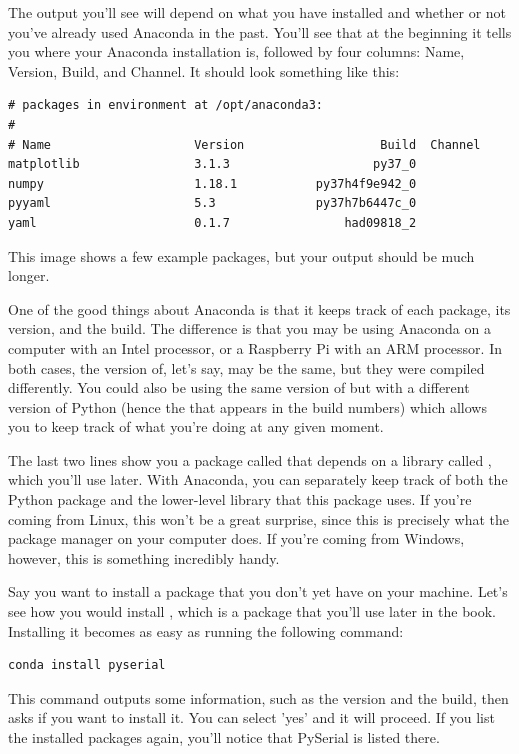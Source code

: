 The output you'll see will depend on what you have installed and whether or not you've already used Anaconda in the past. You'll see that at the beginning it tells you where your Anaconda installation is, followed by four columns: Name, Version, Build, and Channel. It should look something like this:

\begin{verbatim}
# packages in environment at /opt/anaconda3:
#
# Name                    Version                   Build  Channel
matplotlib                3.1.3                    py37_0
numpy                     1.18.1           py37h4f9e942_0
pyyaml                    5.3              py37h7b6447c_0
yaml                      0.1.7                had09818_2
\end{verbatim}

This image shows a few example packages, but your output should be much longer.

One of the good things about Anaconda is that it keeps track of each package, its version, and the build. The difference is that you may be using Anaconda on a computer with an Intel processor, or a Raspberry Pi with an ARM processor. In both cases, the version of, let's say,  may be the same, but they were compiled differently. You could also be using the same version of  but with a different version of Python (hence the  that appears in the build numbers) which allows you to keep track of what you're doing at any given moment.

The last two lines show you a package called  that depends on a library called , which you'll use later. With Anaconda, you can separately keep track of both the Python package and the lower-level library that this package uses. If you're coming from Linux, this won't be a great surprise, since this is precisely what the package manager on your computer does. If you're coming from Windows, however, this is something incredibly handy.

Say you want to install a package that you don't yet have on your machine. Let's see how you would install , which is a package that you'll use later in the book. Installing it becomes as easy as running the following command:

\begin{verbatim}
conda install pyserial
\end{verbatim}

This command outputs some information, such as the version and the build, then asks if you want to install it. You can select 'yes' and it will proceed. If you list the installed packages again, you'll notice that PySerial is listed there.

